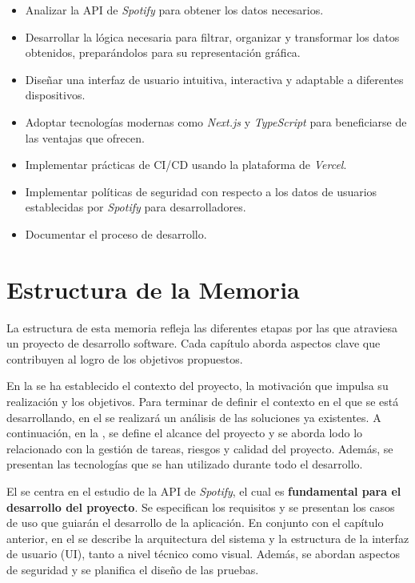 \begin{itemize}
    \item Analizar la API de \textit{Spotify} para obtener los datos necesarios.
    \item Desarrollar la lógica necesaria para filtrar, organizar y transformar los datos obtenidos, preparándolos para su representación gráfica.
    \item Diseñar una interfaz de usuario intuitiva, interactiva y adaptable a diferentes dispositivos.
    \item Adoptar tecnologías modernas como \textit{Next.js} y \textit{TypeScript} para beneficiarse de las ventajas que ofrecen.
    \item Implementar prácticas de CI/CD usando la plataforma de \textit{Vercel}.
    \item Implementar políticas de seguridad con respecto a los datos de usuarios establecidas por \textit{Spotify} para desarrolladores.
    \item Documentar el proceso de desarrollo.
\end{itemize}

\section{Estructura de la Memoria}

La estructura de esta memoria refleja las diferentes etapas por las que atraviesa un proyecto de desarrollo software. Cada capítulo aborda aspectos clave que contribuyen al logro de los objetivos propuestos.

En la  se ha establecido el contexto del proyecto, la motivación que impulsa su realización y los objetivos. Para terminar de definir el contexto en el que se está desarrollando, en el  se realizará un análisis de las soluciones ya existentes. A continuación, en la , se define el alcance del proyecto y se aborda lodo lo relacionado con la gestión de tareas, riesgos y calidad del proyecto. Además, se presentan las tecnologías que se han utilizado durante todo el desarrollo.

El  se centra en el estudio de la API de \textit{Spotify}, el cual es \textbf{fundamental para el desarrollo del proyecto}. Se especifican los requisitos y se presentan los casos de uso que guiarán el desarrollo de la aplicación. En conjunto con el capítulo anterior, en el  se describe la arquitectura del sistema y la estructura de la interfaz de usuario (UI), tanto a nivel técnico como visual. Además, se abordan aspectos de seguridad y se planifica el diseño de las pruebas.

